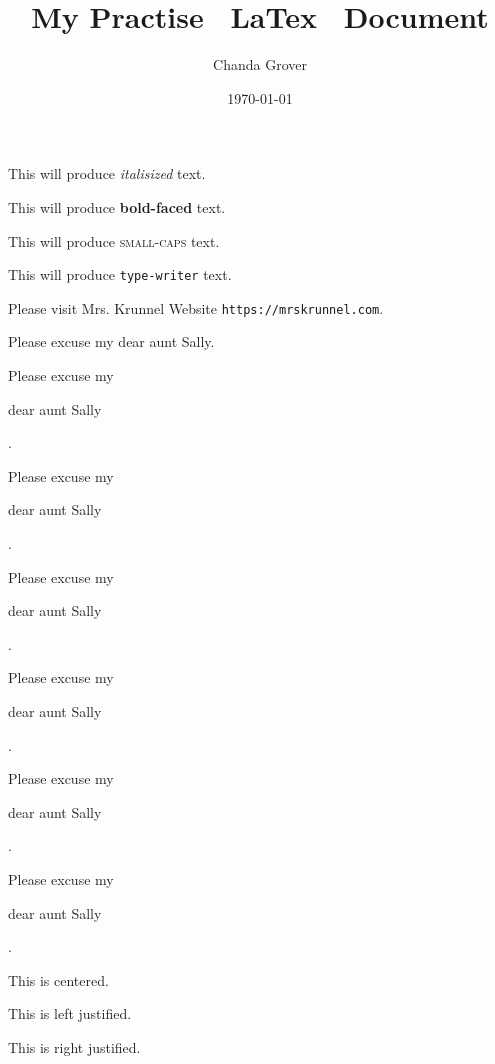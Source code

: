\documentclass[11pt]{article}
\begin{document}
\tableofcontents

\title{My Practise \ LaTex \  Document}
\author{Chanda Grover}
\date{\today}
\maketitle


This will produce \textit{italisized} text.

This will produce \textbf{bold-faced} text.

This will produce \textsc{small-caps} text.

This will produce \texttt{type-writer} text.

Please visit Mrs. Krunnel Website \texttt{https://mrskrunnel.com}.

Please excuse my dear aunt Sally.

Please excuse my \begin{large}dear aunt Sally\end{large}.

Please excuse my \begin{Large}dear aunt Sally\end{Large}.

Please excuse my \begin{huge}dear aunt Sally\end{huge}.

Please excuse my \begin{Huge}dear aunt Sally\end{Huge}.

Please excuse my \begin{small}dear aunt Sally\end{small}.

Please excuse my \begin{tiny}dear aunt Sally\end{tiny}.

\begin{center}
This is centered.
\end{center}

\begin{flushleft}

This is left justified.

\end{flushleft}

\begin{flushright}


This is right justified.


\end{flushright}
\end{document}
